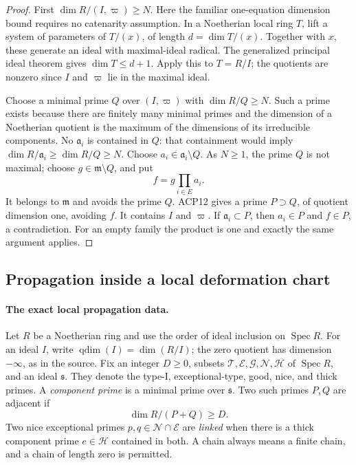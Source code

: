 \begin{proof}
First
\(\dim R/(I,\varpi)\ge N\).
Here the familiar one-equation dimension bound requires no
catenarity assumption.  In a Noetherian local ring \(T\),
lift a system of parameters of \(T/(x)\), of length
\(d=\dim T/(x)\).  Together with \(x\), these generate an
ideal with maximal-ideal radical.  The generalized principal
ideal theorem gives \(\dim T\le d+1\).
Apply this to \(T=R/I\); the quotients are nonzero since
\(I\) and \(\varpi\) lie in the maximal ideal.

Choose a minimal prime \(Q\) over \((I,\varpi)\) with
\(\dim R/Q\ge N\).  Such a prime exists because there are
finitely many minimal primes and the dimension of a Noetherian
quotient is the maximum of the dimensions of its irreducible
components.  No \(\mathfrak a_i\) is contained in \(Q\):
that containment would imply
\(\dim R/\mathfrak a_i\ge\dim R/Q\ge N\).
Choose \(a_i\in\mathfrak a_i\setminus Q\).
As \(N\ge1\), the prime \(Q\) is not maximal; choose
\(g\in\mathfrak m\setminus Q\), and put
\[
                           f=g\prod_{i\in E}a_i.
\]
It belongs to \(\mathfrak m\) and avoids the prime \(Q\).
ACP12 gives a prime \(P\supset Q\), of quotient dimension
one, avoiding \(f\).  It contains \(I\) and \(\varpi\).
If \(\mathfrak a_i\subset P\), then \(a_i\in P\) and
\(f\in P\), a contradiction.  For an empty family the
product is one and exactly the same argument applies.
\end{proof}

\subsection{Propagation inside a local deformation chart}

\paragraph{The exact local propagation data.}
Let \(R\) be a Noetherian ring and use the order of ideal
inclusion on \(\operatorname{Spec}R\).  For an ideal \(I\),
write \(\operatorname{qdim}(I)=\dim(R/I)\); the zero quotient
has dimension \(-\infty\), as in the source.  Fix an integer
\(D\ge0\), subsets
\(\mathcal T,\mathcal E,\mathcal G,\mathcal N,\mathcal H\)
of \(\operatorname{Spec}R\), and an ideal \(\mathfrak s\).
They denote the type-I, exceptional-type, good, nice, and thick
primes.  A \emph{component prime} is a minimal prime over
\(\mathfrak s\).  Two such primes \(P,Q\) are adjacent if
\[
                         \dim R/(P+Q)\ge D.
                                                        \tag{ACP.25}
\]
Two nice exceptional primes \(p,q\in\mathcal N\cap\mathcal E\)
are \emph{linked} when there is a thick component prime
\(e\in\mathcal H\) contained in both.  A chain always means
a finite chain, and a chain of length zero is permitted.

